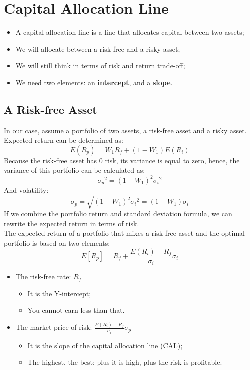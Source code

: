\documentclass[11pt,a4paper]{report}
\begin{document}
\section{Capital Allocation Line}
\begin{itemize}
    \item A capital allocation line is a line that allocates capital between two assets;
    \item We will allocate between a risk-free and a risky asset;
    \item We will still think in terms of risk and return trade-off;
    \item We need two elements: an \textbf{intercept}, and a \textbf{slope}.
\end{itemize}
\subsection{A Risk-free Asset}
In our case, assume a portfolio of two assets, a risk-free asset and a risky asset. Expected return can be determined as:
\[E(R_p) = W_1R_f + (1-W_1)E(R_i)\]
Because the risk-free asset has 0 risk, its variance is equal to zero, hence, the variance of this portfolio can be calculated as:
\[\sigma_p{^2} = (1-W_1)^2\sigma_i{^2}\]
And volatility:
\[\sigma_p = \sqrt{(1-W_1)^2\sigma_i{^2}} = (1-W_1)\sigma_i \]
If we combine the portfolio return and standard deviation formula, we can rewrite the expected return in terms of risk.
\\ The expected return of a portfolio that mixes a risk-free asset and the optimal portfolio is based on two elements:
\[E[R_p] = R_f + \frac{E(R_i) - R_f}{\sigma_i}\sigma_i\]
\begin{itemize}
    \item The risk-free rate: $R_f$
    \begin{itemize}
        \item It is the Y-intercept;
        \item You cannot earn less than that.
    \end{itemize}
    \item The market price of risk: $\frac{E(R_i)-R_f}{\sigma_i}\sigma_p$
    \begin{itemize}
        \item It is the slope of the capital allocation line (CAL);
        \item The highest, the best: plus it is high, plus the risk is profitable.
    \end{itemize}
\end{itemize}
\end{document}
